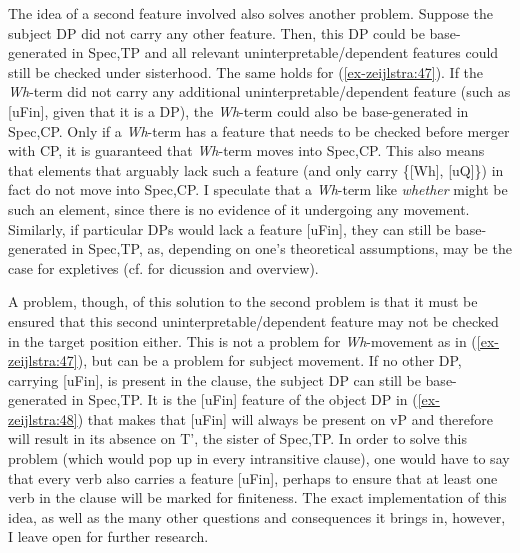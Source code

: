 \documentclass[output=paper
,modfonts
,nonflat]{langsci/langscibook}
\begin{document}
\noindent The idea of a second feature involved also solves another problem. Suppose the subject DP did not carry any other feature. Then, this DP could be base-gen\-er\-ated in Spec,TP and all relevant uninterpretable\slash dependent features could still be checked under sisterhood. The same holds for (\ref{ex-zeijlstra:47}). If the \textit{Wh}-term did not carry any additional uninterpretable\slash dependent feature (such as [uFin], given that it is a DP), the \textit{Wh}-term could also be base-generated in Spec,CP. Only if a \textit{Wh}-term has a feature that needs to be checked before merger with CP, it is guaranteed that \textit{Wh}-term moves into Spec,CP. This also means that elements that arguably lack such a feature (and only carry \{[Wh], [uQ]\}) in fact do not move into Spec,CP. I speculate that a \textit{Wh}{}-term like \textit{whether} might be such an element, since there is no evidence of it undergoing any movement. Similarly, if particular DPs would lack a feature [uFin], they can still be base-generated in Spec,TP, as, depending on one’s theoretical assumptions, may be the case for expletives (cf. \citealt{Chomsky2000,Boskovic2002,Deal2009,Wu2018} for dicussion and overview). 

A problem, though, of this solution to the second problem is that it must be ensured that this second uninterpretable\slash dependent feature may not be checked in the target position either. This is not a problem for \textit{Wh}-movement as in (\ref{ex-zeijlstra:47}), but can be a problem for subject movement. If no other DP, carrying [uFin], is present in the clause, the subject DP can still be base-generated in Spec,TP. It is the [uFin] feature of the object DP in (\ref{ex-zeijlstra:48}) that makes that [uFin] will always be present on vP and therefore will result in its absence on T’, the sister of Spec,TP. In order to solve this problem (which would pop up in every intransitive clause), one would have to say that every verb also carries a feature [uFin], perhaps to ensure that at least one verb in the clause will be marked for finiteness. The exact implementation of this idea, as well as the many other questions and consequences it brings in, however, I leave open for further research.
\end{document}
